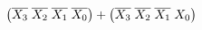 \documentclass[preview]{standalone}
\begin{document}
\begin{align*}
\left(\overline{X_3}\hspace{0.1cm}\overline{X_2}\hspace{0.1cm}\overline{X_1}\hspace{0.1cm}\overline{X_0}\right)+\left(\overline{X_3}\hspace{0.1cm}\overline{X_2}\hspace{0.1cm}\overline{X_1}\hspace{0.1cm}X_0\right)
\end{align*}
\end{document}
